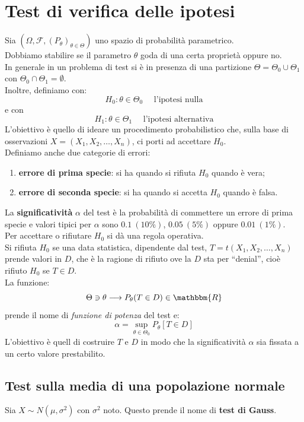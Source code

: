 \documentclass[12pt]{report}
\begin{document}
		\section{Test di verifica delle ipotesi}
		Sia $(\Omega, \mathcal{F}, (P_\theta)_{\theta \in \Theta})$ uno spazio di probabilità parametrico. \\
		Dobbiamo stabilire se il parametro $\theta$ goda di una certa proprietà oppure no. \\
		In generale in un problema di test si è in presenza di una partizione $\Theta = \Theta_0 \cup \Theta_1$ con $\Theta_0 \cap \Theta_1 = \emptyset$. \\
		Inoltre, definiamo con:
		\[
		H_0: \theta \in \Theta_0 \quad \text{ l'ipotesi nulla}
		\]
		e con
		\[
		H_1: \theta \in \Theta_1 \quad \text{ l'ipotesi alternativa}
		\]
		L'obiettivo è quello di ideare un procedimento probabilistico che, sulla base di osservazioni $X = (X_1, X_2, \dots, X_n)$, ci porti ad accettare $H_0$. \\
		Definiamo anche due categorie di errori:
		\begin{enumerate}
			\item \textbf{errore di prima specie}: si ha quando si rifiuta $H_0$ quando è vera;
			\item \textbf{errore di seconda specie}: si ha quando si accetta $H_0$ quando è falsa.
		\end{enumerate}
		La \textbf{significatività} $\alpha$ del test è la probabilità di commettere un errore di prima specie e valori tipici per $\alpha$ sono $0.1\ (10\%)$, $0.05\ (5\%)$ oppure $0.01\ (1\%)$. \\
		Per accettare o rifiutare $H_0$ si dà una regola operativa. \\
		Si rifiuta $H_0$ se una data statistica, dipendente dal test, $T = t(X_1, X_2, \dots, X_n)$ prende valori in $D$, che è la ragione di rifiuto ove la $D$ sta per ``denial'', cioè rifiuto $H_0$ se $T \in D$. \\
		La funzione:
		\[
		\Theta \ni \theta \longrightarrow P_\theta(T \in D) \in \mathbbm{R}
		\]
		prende il nome di \textit{funzione di potenza} del test e:
		\[
		\alpha = \underset{\theta \in \Theta_0}{\sup}P_\theta[T \in D]
		\]
		L'obiettivo è quell di costruire $T$ e $D$ in modo che la significatività $\alpha$ sia fissata a un certo valore prestabilito.
		\subsection{Test sulla media di una popolazione normale}
		Sia $X \sim N(\mu, \sigma^2)$ con $\sigma^2$ noto. Questo prende il nome di \textbf{test di Gauss}.
\end{document}
